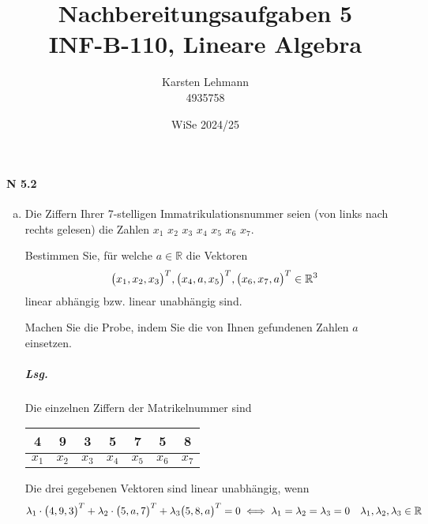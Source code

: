 \documentclass{scrreprt}
\author{Karsten Lehmann \\ 4935758}
\date{WiSe 2024/25}
\title{Nachbereitungsaufgaben 5\\INF-B-110, Lineare Algebra}
\begin{document}
\paragraph{N 5.2}
\begin{enumerate}[(a)]
\item Die Ziffern Ihrer 7-stelligen Immatrikulationsnummer seien (von links nach
  rechts gelesen) die Zahlen $x_1$ $x_2$ $x_3$ $x_4$ $x_5$ $x_6$ $x_7$.

  Bestimmen Sie, für welche $a \in \mathbb{R}$ die Vektoren
  \[
    \qty\big(x_1, x_2, x_3)^T,
    \qty\big(x_4, a, x_5)^T,
    \qty\big(x_6, x_7, a)^T
    \in \mathbb{R}^3
  \]
  linear abhängig bzw. linear unabhängig sind.

  Machen Sie die Probe, indem Sie die von Ihnen gefundenen Zahlen $a$
  einsetzen.

  \subparagraph{Lsg.} Die einzelnen Ziffern der Matrikelnummer sind

  \begin{tabular}{|c|c|c|c|c|c|c|}
    \hline
    4 & 9 & 3 & 5 & 7 & 5 & 8 \\
    \hline
    $x_1$ & $x_2$ & $x_3$ & $x_4$ & $x_5$ & $x_6$ & $x_7$ \\
    \hline
  \end{tabular}

  Die drei gegebenen Vektoren sind linear unabhängig, wenn
  \[
    \lambda_1 \cdot \qty\big(4, 9, 3)^T +
    \lambda_2 \cdot \qty\big(5, a, 7)^T +
    \lambda_3 \qty\big(5, 8, a)^T = 0
    \iff \lambda_1 = \lambda_2 = \lambda_3 = 0 \quad
    \lambda_1, \lambda_2, \lambda_3 \in \mathbb{R}
  \]


\end{enumerate}
\end{document}
